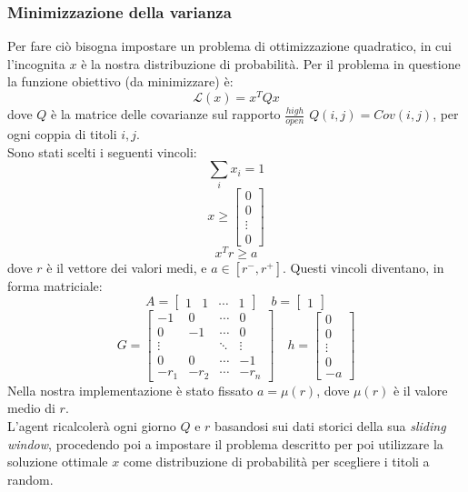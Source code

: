 \documentclass[binding=0.6cm]{sapthesis}
\begin{document}
				\subsubsection{Minimizzazione della varianza}
					Per fare ciò bisogna impostare un problema di ottimizzazione quadratico,
					in cui l'incognita $x$ è la nostra distribuzione di probabilità. Per il problema in questione la funzione obiettivo (da minimizzare) è:
					\[
						\mathcal{L}(x) = x^TQx
					\]
					dove $Q$ è la matrice delle covarianze sul rapporto $\frac{high}{open}$ $Q(i, j) = Cov(i, j)$, per ogni coppia di titoli $i, j$. \\
					Sono stati scelti i seguenti vincoli:
					\[
						\sum_i x_i = 1
					\]
					\[
						x \geq \begin{bmatrix}
							0 \\
							0 \\
							\vdots \\
							0
						\end{bmatrix}
					\]
					\[
						x^Tr \geq a
					\]
					dove $r$ è il vettore dei valori medi, e $a \in [r^-, r^+]$. Questi vincoli diventano, in forma matriciale:
					\[
						A = \begin{bmatrix} 1 & 1 & \cdots & 1\end{bmatrix} \quad b = \begin{bmatrix} 1 \end{bmatrix}
					\]
					\[
						G = \begin{bmatrix}
							-1 &  0 & \cdots & 0 \\
							 0 & -1 & \cdots & 0 \\
							\vdots &    & \ddots & \vdots \\
							 0 &  0 & \cdots & -1 \\[1ex]
							 -r_1 & -r_2 & \cdots & -r_n
						\end{bmatrix}
						\quad
						h = \begin{bmatrix}
							0 \\
							0 \\
							\vdots \\
							0 \\
							-a
						\end{bmatrix}
					\]
					Nella nostra implementazione è stato fissato $a = \mu(r)$, dove $\mu(r)$ è il valore medio di $r$. \\
					L'agent ricalcolerà ogni giorno $Q$ e $r$ basandosi sui dati storici della sua \textit{sliding window}, procedendo poi a
					impostare il problema descritto per poi utilizzare la soluzione ottimale $x$ come distribuzione di probabilità per scegliere i titoli a random.
\end{document}
